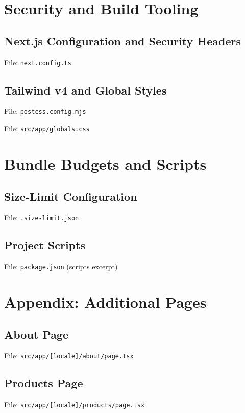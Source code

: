 \documentclass[11pt,a4paper]{article}
\begin{document}
\section{Security and Build Tooling}
\subsection*{Next.js Configuration and Security Headers}
\noindent File: \texttt{next.config.ts}



\subsection*{Tailwind v4 and Global Styles}
\noindent File: \texttt{postcss.config.mjs}



\noindent File: \texttt{src/app/globals.css}



\section{Bundle Budgets and Scripts}
\subsection*{Size-Limit Configuration}
\noindent File: \texttt{.size-limit.json}



\subsection*{Project Scripts}
\noindent File: \texttt{package.json} (scripts excerpt)



\section{Appendix: Additional Pages}
\subsection*{About Page}
\noindent File: \texttt{src/app/[locale]/about/page.tsx}



\subsection*{Products Page}
\noindent File: \texttt{src/app/[locale]/products/page.tsx}


\end{document}
